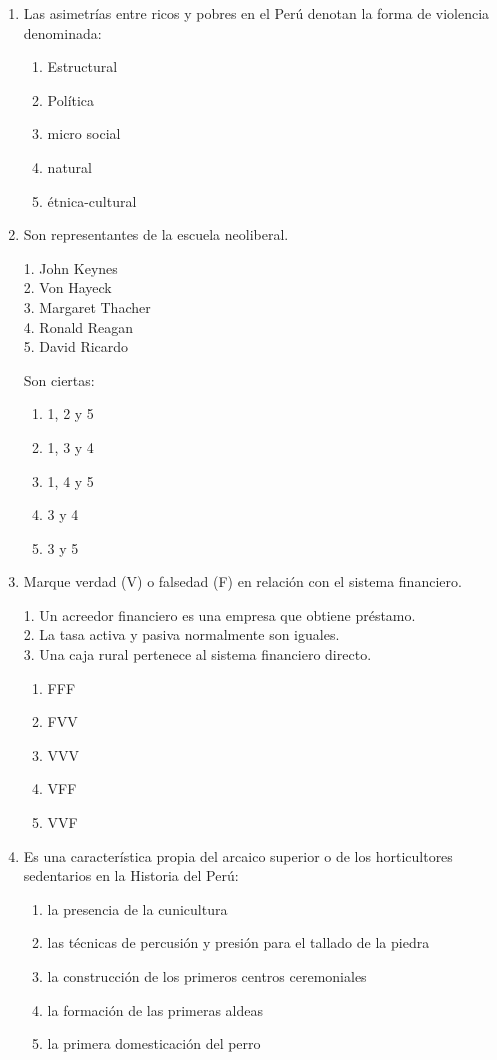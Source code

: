 \begin{enumerate}
	\item Las asimetrías entre ricos y pobres en el Perú denotan la forma de violencia denominada:
	\begin{enumerate}[label=\alph*)]
		\item Estructural
		\item Política
		\item micro social
		\item natural
		\item étnica-cultural
	\end{enumerate}
	
	
		\item Son representantes de la escuela neoliberal.
	
	1. John Keynes\\
	2. Von Hayeck\\
	3. Margaret Thacher\\
	4. Ronald Reagan\\
	5. David Ricardo
	
	Son ciertas:
	\begin{enumerate}[label=\alph*)]
		\item 1, 2 y 5
		\item 1, 3 y 4
		\item 1, 4 y 5
		\item 3 y 4
		\item 3 y 5
	\end{enumerate}
	
	\item Marque verdad (V) o falsedad (F) en relación con el sistema financiero.
	
	1. Un acreedor financiero es una empresa que obtiene préstamo.\\
	2. La tasa activa y pasiva normalmente son iguales.\\
	3. Una caja rural pertenece al sistema financiero directo.
	
	\begin{enumerate}[label=\alph*)]
		\item FFF
		\item FVV
		\item VVV
		\item VFF
		\item VVF
	\end{enumerate}
	
	\item Es una característica propia del arcaico superior o de los horticultores sedentarios en la Historia del Perú:
	\begin{enumerate}[label=\alph*)]
		\item la presencia de la cunicultura
		\item las técnicas de percusión y presión para el tallado de la piedra
		\item la construcción de los primeros centros ceremoniales
		\item la formación de las primeras aldeas
		\item la primera domesticación del perro
	\end{enumerate}
	

\end{enumerate}
